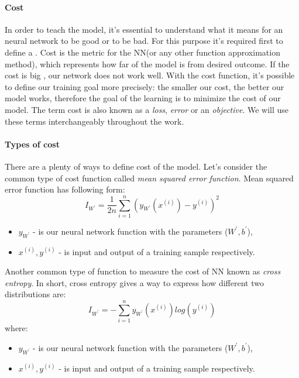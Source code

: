 \paragraph{Cost} In order to teach the model, it's essential to understand
what it means for an neural network to be good or to be bad. For this purpose
it's required first to define a . Cost is the metric
for the \gls{NN}(or any other function approximation method), which represents how far of
the model is from desired outcome. If the cost is big , our network does not work well.
With the cost function, it's possible
to define our training goal more precisely: the smaller our cost, the better our
model works, therefore the goal of the learning is to minimize the cost of our model.
The term cost is also known as a \emph{loss}, \emph{error} or an \emph{objective}. We will use these terms
interchangeably throughout the work.

\paragraph{Types of cost} There are a plenty of ways to define cost of the model.
Let's consider the common type of cost function called \emph{mean squared error function}.
Mean squared error function has following form:
\begin{equation} \label{eq:mse}
	I_{W^\prime} = \frac{1}{2n} \sum_{i=1}^n (y_{W^\prime}(x^{(i)}) - y^{(i)})^2
\end{equation}
\begin{itemize}
	\item $y_{W^\prime}$ - is our neural network function with the parameters ($W^\prime, b^\prime$),
	\item $x^{(i)}, y^{(i)}$ - is input and output of a training sample respectively.
\end{itemize}

Another common type of function to measure the cost of \gls{NN} known as \emph{cross entropy}.
In short, cross entropy gives a way to express how different two distributions are:
\begin{equation} \label{eq:cross_entr}
	I_{W^\prime} = - \sum_{i=1}^n  y_{W^\prime}(x^{(i)}) log(y^{(i)})
\end{equation}
where:
\begin{itemize}
	\item $y_{W^\prime}$ - is our neural network function with the parameters ($W^\prime, b^\prime$),
	\item $x^{(i)}, y^{(i)}$ - is input and output of a training sample respectively.
\end{itemize}
\cite{Nielsen2015}

